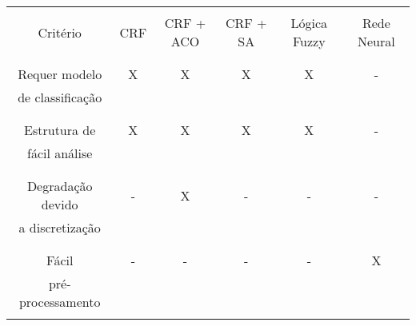 


\begin{table}
  \begin{center}
    \begin{tabular}{|c|c|c|c|c|c|}
      \hline
                        &      &           &          &              &            \\
      Critério          & CRF  & CRF + ACO & CRF + SA & Lógica Fuzzy & Rede Neural\\
                        &      &           &          &              &            \\
      \hline
                        &      &           &          &              &            \\
      Requer modelo     &  X   &     X     &    X     &      X       &      -     \\
      de classificação  &      &           &          &              &            \\
                        &      &           &          &              &            \\
      \hline
                        &      &           &          &              &            \\
      Estrutura de      &  X   &     X     &    X     &      X       &      -     \\
      fácil análise     &      &           &          &              &            \\
                        &      &           &          &              &            \\
      \hline
                        &      &           &          &              &            \\
      Degradação devido &  -   &     X     &    -     &      -       &      -     \\
      a discretização   &      &           &          &              &            \\
                        &      &           &          &              &            \\
      \hline
                        &      &           &          &              &            \\
      Fácil             &  -   &     -     &    -     &      -       &      X     \\
      pré-processamento &      &           &          &              &            \\
                        &      &           &          &              &            \\

\end{tabular}
\end{center}
\end{table}
